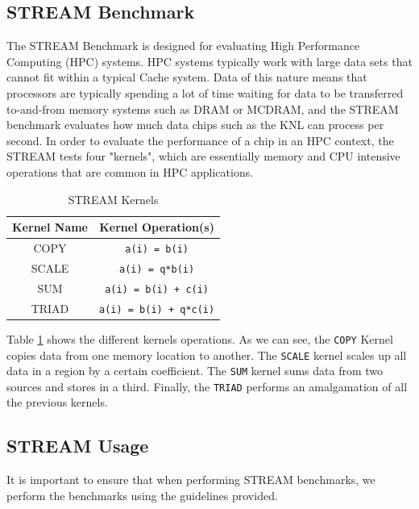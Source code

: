 \documentclass[bsc,frontabs,twoside,singlespacing,parskip,deptreport]{infthesis}     %
\begin{document}
\subsection{STREAM Benchmark}
The STREAM Benchmark is designed for evaluating High Performance Computing (HPC) systems. HPC systems typically work with large data sets that cannot fit within a typical Cache system. Data of this nature means that processors are typically spending a lot of time waiting for data to be transferred to-and-from memory systems such as DRAM or MCDRAM, and the STREAM benchmark evaluates how much data chips such as the KNL can process per second. In order to evaluate the performance of a chip in an HPC context, the STREAM tests four "kernels", which are essentially memory and CPU intensive operations that are common in HPC applications.

\begin{table}[!h]
\begin{center}
\caption{STREAM Kernels}
\label{fig:stream-kernels}
\begin{tabular}{ |c|c| } 
    \hline
    Kernel Name & Kernel Operation(s) \\
    \hline\hline
    COPY    & \texttt{a(i) = b(i)} \\
    \hline
    SCALE   & \texttt{a(i) = q*b(i)} \\
    \hline
    SUM     & \texttt{a(i) = b(i) + c(i)} \\
    \hline
    TRIAD   & \texttt{a(i) = b(i) + q*c(i)} \\
    \hline
\end{tabular}
\end{center}
\end{table}

Table \ref{fig:stream-kernels} shows the different kernels operations. As we can see, the \texttt{COPY} Kernel copies data from one memory location to another. The \texttt{SCALE} kernel scales up all data in a region by a certain coefficient. The \texttt{SUM} kernel sums data from two sources and stores in a third. Finally, the \texttt{TRIAD} performs an amalgamation of all the previous kernels.

\subsection{STREAM Usage}
It is important to ensure that when performing STREAM benchmarks, we perform the benchmarks using the guidelines provided.
\end{document}
